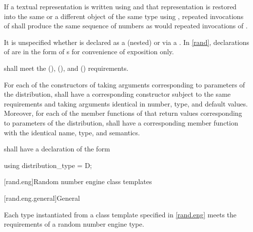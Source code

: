 \pnum
If a textual representation is written using 
and that representation is restored
into the same or a different object 
of the same type using ,
repeated invocations of 
shall produce the same sequence of numbers
as would repeated invocations of .

\pnum
It is unspecified whether 
is declared as a (nested) 
or via a .
In \ref{rand},
declarations of 
are in the form of s
for convenience of exposition only.

\pnum
{} shall meet the
 (),
 (),
and
 () requirements.

\pnum
For each of the constructors of 
taking arguments corresponding to parameters of the distribution,
 shall have a corresponding constructor
subject to the same requirements
and taking arguments identical in number, type, and default values.
Moreover,
for each of the member functions of 
that return values corresponding to parameters of the distribution,
 shall have a corresponding member function
with the identical name, type, and semantics.

\pnum
{} shall have a declaration of the form
\begin{codeblock}
using distribution_type =  D;
\end{codeblock}

%
%




[rand.eng]{Random number engine class templates}%

[rand.eng.general]{General}%

\pnum
Each type instantiated
from a class template specified in \ref{rand.eng}
meets the requirements
of a random number engine type.


